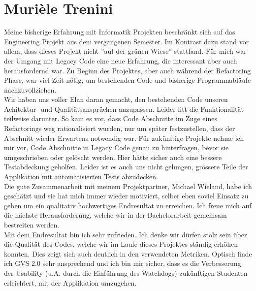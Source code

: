 \documentclass[11pt,a4paper,english,oneside]{book}
\numberwithin{equation}{chapter}
\begin{document}
	\section{Murièle Trenini}
	
	Meine bisherige Erfahrung mit Informatik Projekten beschränkt sich auf das Engineering Projekt aus dem vergangenen Semester. Im Kontrast dazu stand vor allem, dass dieses Projekt nicht ''auf der grünen Wiese'' stattfand. Für mich war der Umgang mit Legacy Code eine neue Erfahrung, die interessant aber auch herausfordernd war. Zu Beginn des Projektes, aber auch während der Refactoring Phase, war viel Zeit nötig, um bestehenden Code und bisherige Programmabläufe nachzuvollziehen.  \\
	
	Wir haben uns voller Elan daran gemacht, den bestehenden Code unseren Achitektur- und Qualitätsansprüchen anzupassen. Leider litt die Funktionalität teilweise darunter. So kam es vor, dass Code Abschnitte im Zuge eines Refactorings weg rationalisiert wurden, nur um später festzustellen, dass der Abschnitt wieder Erwartens notwendig war. Für zukünftige Projekte nehme ich mir vor, Code Abschnitte in Legacy Code genau zu hinterfragen, bevor sie umgeschrieben oder gelöscht werden. Hier hätte sicher auch eine bessere Testabdeckung geholfen. Leider ist es auch uns nicht gelungen, grössere Teile der Applikation mit automatisierten Tests abzudecken. \\
	
	Die gute Zusammenarbeit mit meinem Projektpartner, Michael Wieland, habe ich geschätzt und sie hat mich immer wieder motiviert, selber eben soviel Einsatz zu geben um ein qualitativ hochwertiges Endresultat zu erreichen. Ich freue mich auf die nächste Herausforderung, welche wir in der Bachelorarbeit gemeinsam bestreiten werden.\\
	
	Mit dem Endresultat bin ich sehr zufrieden.  Ich denke wir dürfen stolz sein über die Qualität des Codes, welche wir im Laufe dieses Projektes ständig erhöhen konnten. Dies zeigt sich auch deutlich in den verwendeten Metriken. Optisch finde ich GVS 2.0 sehr ansprechend und ich bin mir sicher, dass es die Verbesserung der Usability (u.A. durch die Einführung des Watchdogs) zukünftigen Studenten erleichtert, mit der Applikation umzugehen.
	
	\clearpage
\end{document}
